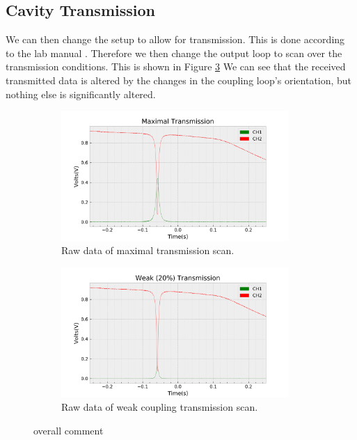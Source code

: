 \subsection{Cavity Transmission}

We can then change the setup to allow for transmission. This is done according to the lab manual \cite{LabProcedure}. Therefore we then change the output loop to scan over the transmission conditions. This is shown in Figure \ref{fig:B_trans_raw} We can see that the received transmitted data is altered by the changes in the coupling loop's orientation, but nothing else is significantly altered.

\begin{figure}[h!]
\centering
\begin{subfigure}[t]{.475\textwidth}
  \centering
  \includegraphics[width=0.95\textwidth]{figures/PartB/scope_6.png}
  \caption{Raw data of maximal transmission scan.}
 \label{fig:B_trans_max_raw}
\end{subfigure}\hfill
\begin{subfigure}[t]{.475\textwidth}
  \centering
  \includegraphics[width=0.95\textwidth]{figures/PartB/scope_5.png}
  \caption{Raw data of weak coupling transmission scan.}
\label{fig:B_trans_weak_raw}
\end{subfigure}
\caption{overall comment}
\label{fig:B_trans_raw}
\end{figure}

